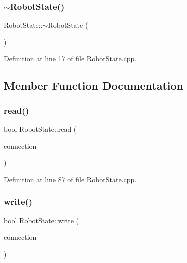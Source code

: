 \subsubsection{\texorpdfstring{$\sim$\+Robot\+State()}{~RobotState()}}
{\footnotesize\ttfamily Robot\+State\+::$\sim$\+Robot\+State (\begin{DoxyParamCaption}{ }\end{DoxyParamCaption})\hspace{0.3cm}{\ttfamily [virtual]}}



Definition at line 17 of file Robot\+State.\+cpp.



\subsection{Member Function Documentation}
\hypertarget{classocra__recipes_1_1RobotState_a98e0e09ec0829542fab9037f6c8f6301}{}\label{classocra__recipes_1_1RobotState_a98e0e09ec0829542fab9037f6c8f6301} 
\subsubsection{\texorpdfstring{read()}{read()}}
{\footnotesize\ttfamily bool Robot\+State\+::read (\begin{DoxyParamCaption}\item[{yarp\+::os\+::\+Connection\+Reader \&}]{connection }\end{DoxyParamCaption})\hspace{0.3cm}{\ttfamily [virtual]}}



Definition at line 87 of file Robot\+State.\+cpp.

\hypertarget{classocra__recipes_1_1RobotState_aa99fa493c3fe185f2018059f35e56164}{}\label{classocra__recipes_1_1RobotState_aa99fa493c3fe185f2018059f35e56164} 
\subsubsection{\texorpdfstring{write()}{write()}}
{\footnotesize\ttfamily bool Robot\+State\+::write (\begin{DoxyParamCaption}\item[{yarp\+::os\+::\+Connection\+Writer \&}]{connection }\end{DoxyParamCaption})\hspace{0.3cm}{\ttfamily [virtual]}}



